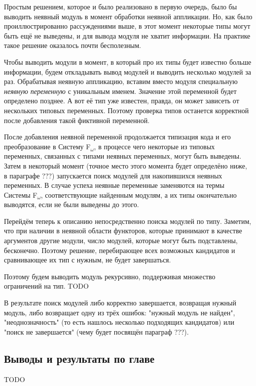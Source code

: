 \documentclass[../diploma.tex]{subfiles}
\begin{document}
Простым решением, которое и было реализовано в первую очередь, было бы выводить неявный модуль в момент обработки неявной аппликации. Но, как было проиллюстрированно рассуждениями выше, в этот момент некоторые типы могут быть ещё не выведены, и для вывода модуля не хватит информации. На практике такое решение оказалось почти бесполезным.

Чтобы выводить модули в момент, в который про их типы будет известно больше информации, будем откладывать вывод модулей и выводить несколько модулей за раз. Обрабатывая неявную аппликацию, вставим вместо модуля специальную \textit{неявную переменную} с уникальным именем. Значение этой переменной будет определено позднее. А вот её тип уже известен, правда, он может зависеть от нескольких типовых переменных. Поэтому проверка типов останется корректной после добавления такой фиктивной переменной. 

После добавления неявной переменной продолжается типизация кода и его преобразование в Систему F\textsubscript{$\omega$}, в процессе чего некоторые из типовых переменных, связанных с типами неявных переменных, могут быть выведены. Затем в некоторый момент (точное место этого момента будет определёно ниже, в параграфе ???) запускается поиск модулей для накопившихся неявных переменных. В случае успеха неявные переменные заменяются на термы Системы F\textsubscript{$\omega$}, соответствующие найденным модулям, а их типы окончательно выводятся, если не были выведены до этого.

Перейдём теперь к описанию непосредственно поиска модулей по типу. Заметим, что при наличии в неявной области функторов, которые принимают в качестве аргументов другие модули, число модулей, которые могут быть подставлены, бесконечно. Поэтому решение, перебирающее всех возможных кандидатов и сравнивающее их тип с нужным, не будет завершаться.

Поэтому будем выводить модуль рекурсивно, поддерживая множество ограничений на тип. TODO

В результате поиск модулей либо корректно завершается, возвращая нужный модуль, либо возвращает одну из трёх ошибок: "нужный модуль не найден", "неоднозначность" (то есть нашлось несколько подходящих кандидатов) или "поиск не завершается" (чему будет посвящён параграф ???).

\subsection{Выводы и результаты по главе}

TODO
\end{document}
